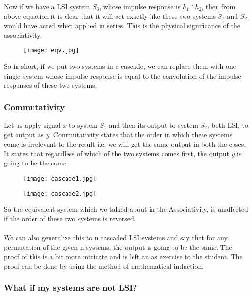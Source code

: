Now if we have a LSI system $S_{3}$, whose impulse response is $h_{1}*h_{2}$, then from above equation it is clear that it will act exactly like these two systems $S_{1}$ and $S_{2}$ would have acted when applied in series. This is the physical significance of the associativity.\\

\begin{figure}[ht]
\centering
\texttt{[image: eqv.jpg]}
\end{figure}

So  in short, if we put two systems in a cascade, we can replace them with one single system whose impulse response is equal to the convolution of the impulse responses of these two systems.

\subsubsection{Commutativity}

Let us apply signal $x$ to system $S_{1}$ and then its output to system $S_{2}$, both LSI, to get output as $y$. Commutativity states that the order in which these systems come is irrelevant to the result i.e. we will get the same output in both the cases.  It states that regardless of which of the two systems comes first, the output $y$ is going to be the same.\\

\begin{figure}[ht]
\centering
\texttt{[image: cascade1.jpg]}
\end{figure}
\begin{figure}[ht]
\centering
\texttt{[image: cascade2.jpg]}
\end{figure}

So the equivalent system which we talked about in the Associativity, is unaffected if the order of these two systems is reversed.\\\\

We can also generalize this to n cascaded LSI systems and say that for any permutation of the given n systems, the output is going to be the same. The proof of this is a bit more intricate and is left an as exercise to the student. The proof can be done by using the method of mathematical induction.

\subsubsection{What if my systems are not LSI?}

